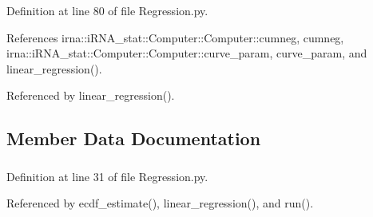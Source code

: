\-Definition at line 80 of file \-Regression.\-py.



\-References irna\-::i\-R\-N\-A\-\_\-stat\-::\-Computer\-::\-Computer\-::cumneg, cumneg, irna\-::i\-R\-N\-A\-\_\-stat\-::\-Computer\-::\-Computer\-::curve\-\_\-param, curve\-\_\-param, and linear\-\_\-regression().



\-Referenced by linear\-\_\-regression().



\subsection{\-Member \-Data \-Documentation}
\hypertarget{classirna_1_1iRNA__stat_1_1Regression_1_1Regression_ae974f46c06f4da096345e076629b366e}{
\subsubsection[{cumneg}]{}}
\label{classirna_1_1iRNA__stat_1_1Regression_1_1Regression_ae974f46c06f4da096345e076629b366e}


\-Definition at line 31 of file \-Regression.\-py.



\-Referenced by ecdf\-\_\-estimate(), linear\-\_\-regression(), and run().

\hypertarget{classirna_1_1iRNA__stat_1_1Regression_1_1Regression_a0b0489a329eeb5ab497662662872e07e}{
\subsubsection[{curve\-\_\-param}]{}}
\label{classirna_1_1iRNA__stat_1_1Regression_1_1Regression_a0b0489a329eeb5ab497662662872e07e}


